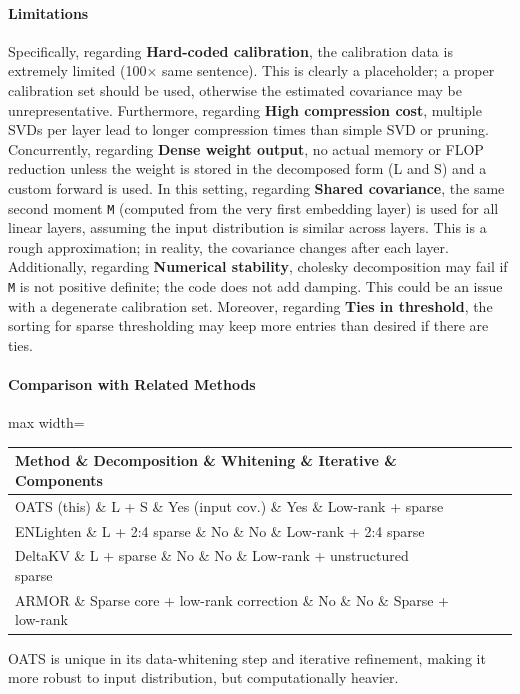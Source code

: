 \paragraph{Limitations}

Specifically, regarding \textbf{Hard-coded calibration}, the calibration data is extremely limited (100$\times$ same sentence). This is clearly a placeholder; a proper calibration set should be used, otherwise the estimated covariance may be unrepresentative. Furthermore, regarding \textbf{High compression cost}, multiple SVDs per layer lead to longer compression times than simple SVD or pruning. Concurrently, regarding \textbf{Dense weight output}, no actual memory or FLOP reduction unless the weight is stored in the decomposed form (L and S) and a custom forward is used. In this setting, regarding \textbf{Shared covariance}, the same second moment \texttt{M} (computed from the very first embedding layer) is used for all linear layers, assuming the input distribution is similar across layers. This is a rough approximation; in reality, the covariance changes after each layer. Additionally, regarding \textbf{Numerical stability}, cholesky decomposition may fail if \texttt{M} is not positive definite; the code does not add damping. This could be an issue with a degenerate calibration set. Moreover, regarding \textbf{Ties in threshold}, the sorting for sparse thresholding may keep more entries than desired if there are ties.


\paragraph{Comparison with Related Methods}

\begin{center}
\begin{adjustbox}{max width=\columnwidth}
\renewcommand{\arraystretch}{1.2}
\begin{tabular}{lllll}
\toprule
Method \& Decomposition \& Whitening \& Iterative \& Components \\
\midrule
OATS (this) \& L + S \& Yes (input cov.) \& Yes \& Low-rank + sparse \\
ENLighten \& L + 2:4 sparse \& No \& No \& Low-rank + 2:4 sparse \\
DeltaKV \& L + sparse \& No \& No \& Low-rank + unstructured sparse \\
ARMOR \& Sparse core + low-rank correction \& No \& No \& Sparse + low-rank \\

\bottomrule
\end{tabular}
\end{adjustbox}
\end{center}
OATS is unique in its data-whitening step and iterative refinement, making it more robust to input distribution, but computationally heavier.


